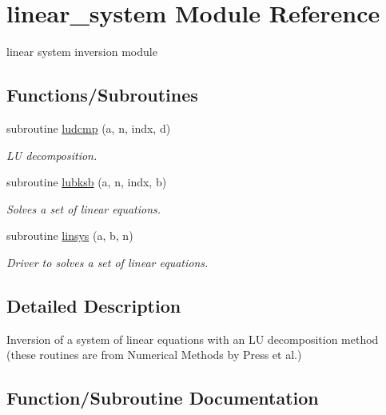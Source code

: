 \hypertarget{namespacelinear__system}{}\section{linear\+\_\+system Module Reference}
\label{namespacelinear__system}


linear system inversion module  


\subsection*{Functions/\+Subroutines}
\begin{DoxyCompactItemize}
\item 
subroutine \hyperlink{namespacelinear__system_ad77fb788295266bcc818f72d6677bf9d}{ludcmp} (a, n, indx, d)
\begin{DoxyCompactList}\small\item\em L\+U decomposition. \end{DoxyCompactList}\item 
subroutine \hyperlink{namespacelinear__system_acdd63cedefa6077e4100904703d6b82d}{lubksb} (a, n, indx, b)
\begin{DoxyCompactList}\small\item\em Solves a set of linear equations. \end{DoxyCompactList}\item 
subroutine \hyperlink{namespacelinear__system_a51e9428c30e00182fa86755204de7762}{linsys} (a, b, n)
\begin{DoxyCompactList}\small\item\em Driver to solves a set of linear equations. \end{DoxyCompactList}\end{DoxyCompactItemize}


\subsection{Detailed Description}
Inversion of a system of linear equations with an L\+U decomposition method (these routines are from Numerical Methods by Press et al.) 

\subsection{Function/\+Subroutine Documentation}
\hypertarget{namespacelinear__system_a51e9428c30e00182fa86755204de7762}{}
